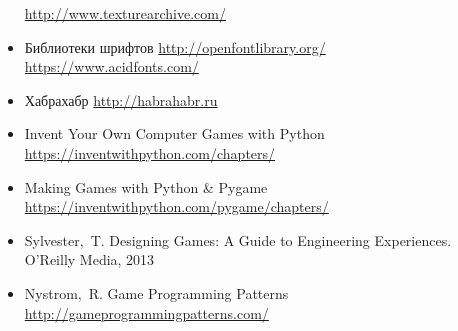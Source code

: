\begin{itemize}
        \url{http://www.texturearchive.com/}
    \item Библиотеки шрифтов \url{http://openfontlibrary.org/}\\
        \url{https://www.acidfonts.com/}
    \item Хабрахабр \url{http://habrahabr.ru}
    \item Invent Your Own Computer Games with Python\\
        \url{https://inventwithpython.com/chapters/}
    \item Making Games with Python \& Pygame\\
        \url{https://inventwithpython.com/pygame/chapters/}
    \item Sylvester,~T. Designing Games: A Guide to Engineering Experiences. O'Reilly Media, 2013
    \item Nystrom,~R. Game Programming Patterns \url{http://gameprogrammingpatterns.com/}
\end{itemize}